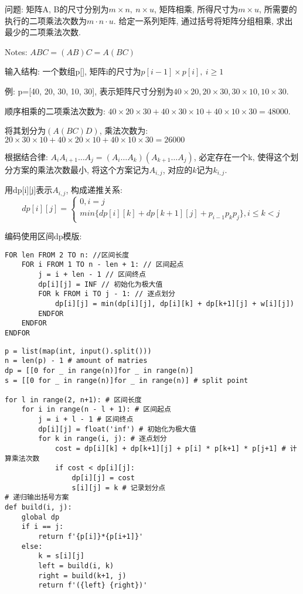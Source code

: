 \documentclass[../main]{subfiles}
\begin{document}
\begin{sloppy}
问题: 矩阵A, B的尺寸分别为$m \times n,\ n \times u$, 矩阵相乘, 所得尺寸为$m \times u$, 所需要的执行的二项乘法次数为$m \cdot n \cdot u$. 给定一系列矩阵, 通过括号将矩阵分组相乘, 求出最少的二项乘法次数.

Notes: $ABC = (AB)C = A(BC)$

输入结构: 一个数组p[], 矩阵i的尺寸为$p[i-1] \times p[i],\ i \geq 1$

例: p=[40, 20, 30, 10, 30], 表示矩阵尺寸分别为$40 \times 20, 20 \times 30, 30 \times 10, 10 \times 30$.

顺序相乘的二项乘法次数为: $40 \times 20 \times 30 + 40 \times 30 \times 10 + 40 \times 10 \times 30 = 48000$.

将其划分为$(A(BC)D)$, 乘法次数为: $20 \times 30 \times 10 + 40 \times 20 \times 10 + 40 \times 10 \times 30 = 26000$


根据结合律: $A_i A_{i+1} \dots A_j = (A_i \dots A_k)(A_{k+1} \dots A_j)$, 必定存在一个k, 使得这个划分方案的乘法次数最小, 将这个方案记为$A_{i, j}$, 对应的$k$记为$k_{i, j}$.

用dp[i][j]表示$A_{i, j}$, 构成递推关系:
\begin{equation*}
    dp[i][j] = 
    \begin{cases}
    0, i = j \\
    min\{dp[i][k] + dp[k+1][j] + p_{i-1} p_k p_j\}, i \leq k < j
    \end{cases}
\end{equation*}

编码使用区间dp模版:
\begin{lstlisting}[style = Pseudocode]
FOR len FROM 2 TO n: //区间长度
    FOR i FROM 1 TO n - len + 1: // 区间起点
        j = i + len - 1 // 区间终点
        dp[i][j] = INF // 初始化为极大值
        FOR k FROM i TO j - 1: // 逐点划分
            dp[i][j] = min(dp[i][j], dp[i][k] + dp[k+1][j] + w[i][j])
        ENDFOR
    ENDFOR
ENDFOR
\end{lstlisting}

\begin{lstlisting}[style = Python]
p = list(map(int, input().split()))
n = len(p) - 1 # amount of matries
dp = [[0 for _ in range(n)]for _ in range(n)]
s = [[0 for _ in range(n)]for _ in range(n)] # split point

for l in range(2, n+1): # 区间长度
    for i in range(n - l + 1): # 区间起点
        j = i + l - 1 # 区间终点
        dp[i][j] = float('inf') # 初始化为极大值
        for k in range(i, j): # 逐点划分
            cost = dp[i][k] + dp[k+1][j] + p[i] * p[k+1] * p[j+1] # 计算乘法次数
            if cost < dp[i][j]:
                dp[i][j] = cost
                s[i][j] = k # 记录划分点
# 递归输出括号方案
def build(i, j):
    global dp
    if i == j:
        return f'{p[i]}*{p[i+1]}'
    else:
        k = s[i][j]
        left = build(i, k)
        right = build(k+1, j)
        return f'({left} {right})'
    

\end{lstlisting}
\end{sloppy}
\end{document}
